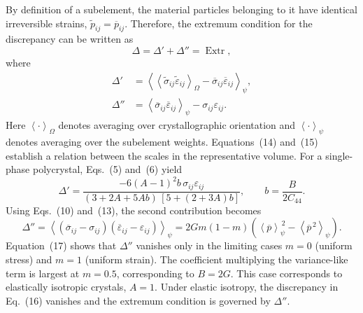 \documentclass[11pt,a4paper]{article}
\numberwithin{equation}{section}
\newcommand{\avg}[2][]{\left\langle #2\right\rangle_{#1}}
\newcommand{\Extr}{\operatorname{Extr}}
\begin{document}
By definition of a subelement, the material particles belonging to it have identical irreversible strains, $\widetilde p_{ij}=\overline p_{ij}$. Therefore, the extremum condition for the discrepancy can be written as
\begin{equation}
 \Delta=\Delta'+\Delta''=\Extr,
\end{equation}
where
\begin{equation}
\begin{aligned}
 \Delta'
 &=\avg[\psi]{\avg[\Omega]{\widetilde\sigma_{ij}\widetilde\varepsilon_{ij}}
                -\overline\sigma_{ij}\overline\varepsilon_{ij}},\\
 \Delta''
 &=\avg[\psi]{\overline\sigma_{ij}\overline\varepsilon_{ij}}
   -\sigma_{ij}\varepsilon_{ij}.
\end{aligned}
\end{equation}
Here $\avg[\Omega]{\cdot}$ denotes averaging over crystallographic orientation and $\avg[\psi]{\cdot}$ denotes averaging over the subelement weights. Equations~(14) and~(15) establish a relation between the scales in the representative volume. For a single-phase polycrystal, Eqs.~(5) and~(6) yield
\begin{equation}
 \Delta'
 =\frac{-6(A-1)^2b\,\sigma_{ij}\varepsilon_{ij}}
 {(3+2A+5Ab)\,[5+(2+3A)b]},
 \qquad
 b=\frac{B}{2C_{44}}.
\end{equation}
Using Eqs.~(10) and~(13), the second contribution becomes
\begin{equation}
 \Delta''
 =\avg[\psi]{(\overline\sigma_{ij}-\sigma_{ij})
              (\overline\varepsilon_{ij}-\varepsilon_{ij})}
 =2Gm(1-m)\left(\avg[\psi]{\overline p}^{\,2}
                         -\avg[\psi]{\overline p^{\,2}}\right).
\end{equation}
Equation~(17) shows that $\Delta''$ vanishes only in the limiting cases $m=0$ (uniform stress) and $m=1$ (uniform strain). The coefficient multiplying the variance-like term is largest at $m=0.5$, corresponding to $B=2G$. This case corresponds to elastically isotropic crystals, $A=1$. Under elastic isotropy, the discrepancy in Eq.~(16) vanishes and the extremum condition is governed by $\Delta''$.
\end{document}

